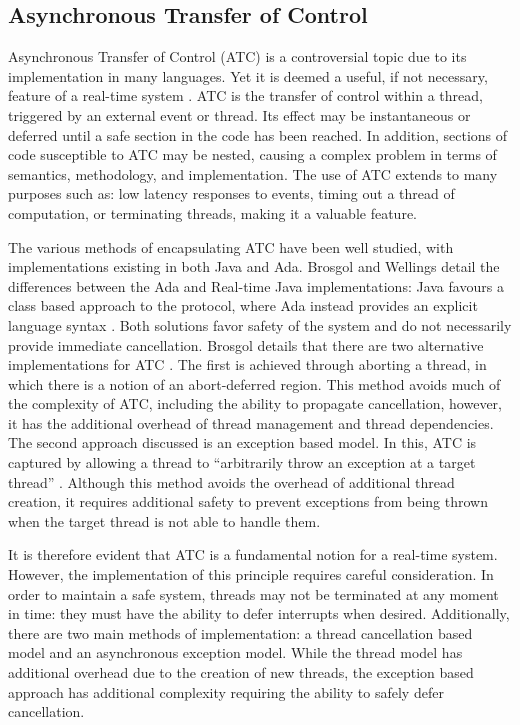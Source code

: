 \subsection{Asynchronous Transfer of Control}
Asynchronous Transfer of Control (ATC) is a controversial topic due to
its implementation in many languages. Yet it is deemed a useful, if not
necessary, feature of a real-time system \cite{atc-article}.  ATC is the
transfer of control within a thread, triggered by an external
event or thread.  Its effect may be instantaneous or deferred until a safe
section in the code has been reached. In addition, sections of code susceptible
to ATC may be nested, causing a complex problem in terms of semantics,
methodology, and implementation. The use of ATC extends to many
purposes such as: low latency responses to events, timing out a thread of
computation, or terminating threads, making it a valuable feature. 
\par\bigskip\noindent
The various methods of encapsulating ATC have been well studied, with 
implementations existing in both Java
and Ada. Brosgol and Wellings detail the differences between the Ada and
Real-time Java implementations: Java favours a class based approach to
the protocol, where Ada instead provides an explicit language syntax
\cite{atc-article}. Both solutions favor safety of the system and do not
necessarily provide immediate cancellation. Brosgol 
details that there are two alternative implementations for
ATC \cite{Brosgol:2002:ATC}.
The first is achieved through aborting a thread, in which there is a notion of
an abort-deferred region. 
This method avoids much of the complexity of ATC, including the ability to
propagate cancellation, however, it has the additional overhead of thread management and
thread dependencies.  
The second approach discussed is an exception based model. 
In this, ATC is captured by allowing a thread to ``arbitrarily throw an
exception at a target thread'' \cite{Brosgol:2002:ATC}.  
Although this method avoids the overhead of additional
thread creation, it requires additional safety to prevent exceptions
from being thrown when the target thread is not able to handle them.
\par\bigskip\noindent
It is therefore evident that ATC
is a fundamental notion for a real-time system. However, the implementation of 
this principle requires careful consideration. 
In order to maintain a safe system, threads may not be
terminated at any moment in time: they must have the ability to defer
interrupts when desired. 
Additionally, there are two main methods of
implementation: a thread cancellation based model and an asynchronous
exception model. While the thread model has additional overhead due to the
creation of new threads, the exception based approach has additional complexity
requiring the ability to safely defer cancellation.

